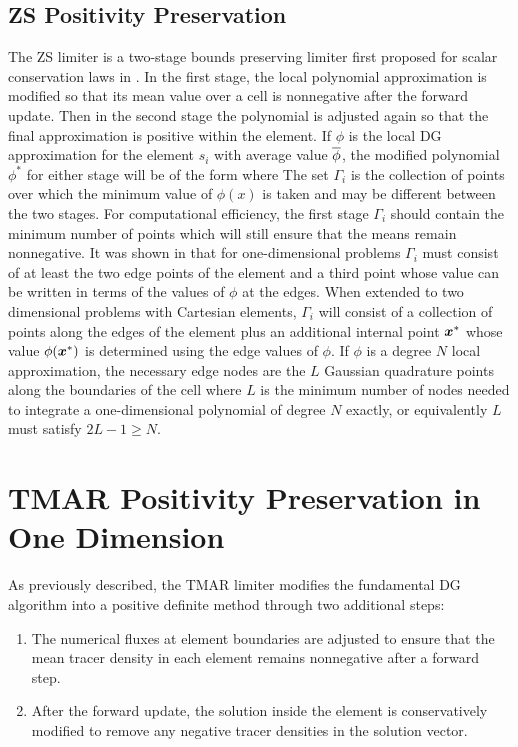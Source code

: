 \documentclass{ametsoc}
\begin{document}
\subsection*{ZS Positivity Preservation}
The ZS limiter is a two-stage bounds preserving limiter first proposed for scalar conservation laws in \citet{Zhang2010}.  In the first stage, the local polynomial approximation is modified so that its mean value over a cell is nonnegative after the forward update. Then in the second stage the polynomial is adjusted again so that the final approximation is positive within the element. If $\phi$ is the local DG approximation for the element $s_i$ with average value $\overline{\phi}$, the modified polynomial $\phi^*$ for either stage will be of the form
where 
The set $\Gamma_i$ is the collection of points over which the minimum value of $\phi(x)$ is taken and may be different between the two stages. For computational efficiency, the first stage $\Gamma_i$ should contain the minimum number of points which will still ensure that the means remain nonnegative. It was shown in \citet{Zhang:2011aa} that for one-dimensional problems $\Gamma_i$ must consist of at least the two edge points of the element and a third point whose value can be written in terms of the values of $\phi$ at the edges. When extended to two dimensional problems with Cartesian elements, $\Gamma_i$ will consist of a collection of points along the edges of the element plus an additional internal point $\boldsymbol{x}^*$ whose value $\phi(\boldsymbol{x}^*)$ is determined using the edge values of $\phi$. If $\phi$ is a  degree $N$ local approximation, the necessary edge nodes are the $L$ Gaussian quadrature points along the boundaries of the cell where $L$ is the minimum number of nodes needed to integrate a one-dimensional polynomial of degree $N$ exactly, or equivalently $L$ must satisfy $2L-1 \geq N$.

\section{TMAR Positivity Preservation in One Dimension} \label{sec:pp1d}
As previously described, the TMAR limiter modifies the fundamental DG algorithm into a positive definite method through two additional steps: 
\begin{enumerate}
\item The numerical fluxes at element boundaries are adjusted to ensure that the mean tracer density in each element remains nonnegative after a forward step.
\item After the forward update, the solution inside the element is conservatively modified to remove any negative tracer densities in the solution vector.
\end{enumerate}
\end{document}
